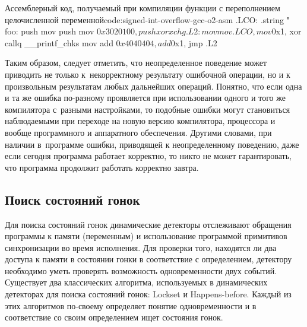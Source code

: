 \begin{listing}{Ассемблерный код{,} получаемый при компиляции функции с переполнением целочисленной переменной}{code:signed-int-overflow-gcc-o2-asm}
.LCO:
  .string "%
foo:
  push   %
  mov    %
  push   %
  mov    $0x3020100, %
  push   %
  xor    %
  xchg   %
.L2:
  mov    %
  mov    .LCO, %
  mov    $0x1, %
  xor    %
  callq  __printf_chks
  mov    %
  add    $0x4040404, %
  add    $0x1, %
  jmp    .L2
\end{listing}

Таким образом, следует отметить, что неопределенное поведение может приводить не только к~некорректному результату ошибочной операции, но и к произвольным результатам любых дальнейших операций.
Понятно, что если одна и та же ошибка по-разному проявляется при использовании одного и того же компилятора с~разными настройками, то подобные ошибки могут становиться наблюдаемыми при переходе на новую версию компилятора, процессора и вообще программного и аппаратного обеспечения.
Другими словами, при наличии в~программе ошибки, приводящей к неопределенному поведению, даже если сегодня программа работает корректно, то никто не может гарантировать, что программа продолжит работать корректно завтра.


\subsection{Поиск состояний гонок}

Для поиска состояний гонок динамические детекторы отслеживают обращения программы к памяти (переменным) и использование программой примитивов синхронизации во время исполнения.
Для проверки того, находятся ли два доступа к памяти в состоянии гонки в соответствие с определением, детектору необходимо уметь проверять возможность одновременности двух событий.
Существует два классических алгоритма, используемых в динамических детекторах для поиска состояний гонок: Lockset и Happens-before.
Каждый из этих алгоритмов по-своему определяет понятие одновременности и в соответствие со своим определением ищет состояния гонок.



